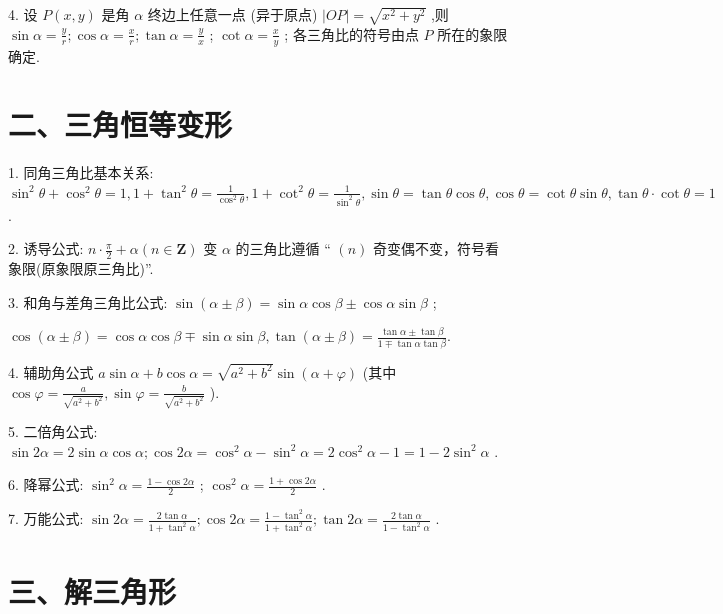 4. 设 $P\left( {x,y}\right)$ 是角 $\alpha$ 终边上任意一点 (异于原点) $\left| {OP}\right|  = \sqrt{{x}^{2} + {y}^{2}}$ ,则 $\sin \alpha  = \frac{y}{r};\cos \alpha  = \frac{x}{r};\tan \alpha  = \frac{y}{x}$ ; $\cot \alpha  = \frac{x}{y}$ ; 各三角比的符号由点 $P$ 所在的象限确定.

\section*{二、三角恒等变形}

1. 同角三角比基本关系: ${\sin }^{2}\theta  + {\cos }^{2}\theta  = 1,1 + {\tan }^{2}\theta  = \frac{1}{{\cos }^{2}\theta },1 + {\cot }^{2}\theta  = \frac{1}{{\sin }^{2}\theta },\sin \theta  = \tan \theta \cos \theta ,\cos \theta  =  \cot \theta \sin \theta ,\tan \theta  \cdot  \cot \theta  = 1$ .

2. 诱导公式: $n \cdot  \frac{\pi }{2} + \alpha \left( {n \in  \mathbf{Z}}\right)$ 变 $\alpha$ 的三角比遵循 “ $\left( n\right)$ 奇变偶不变，符号看象限(原象限原三角比)”.

3. 和角与差角三角比公式: $\sin \left( {\alpha  \pm  \beta }\right)  = \sin \alpha \cos \beta  \pm  \cos \alpha \sin \beta$ ;

$\cos \left( {\alpha  \pm  \beta }\right)  = \cos \alpha \cos \beta  \mp  \sin \alpha \sin \beta ,\tan \left( {\alpha  \pm  \beta }\right)  = \frac{\tan \alpha  \pm  \tan \beta }{1 \mp  \tan \alpha \tan \beta }.$

4. 辅助角公式 $a\sin \alpha  + b\cos \alpha  = \sqrt{{a}^{2} + {b}^{2}}\sin \left( {\alpha  + \varphi }\right)$ (其中 $\cos \varphi  = \frac{a}{\sqrt{{a}^{2} + {b}^{2}}},\sin \varphi  = \frac{b}{\sqrt{{a}^{2} + {b}^{2}}}$ ).

5. 二倍角公式: $\sin {2\alpha } = 2\sin \alpha \cos \alpha ;\cos {2\alpha } = {\cos }^{2}\alpha  - {\sin }^{2}\alpha  = 2{\cos }^{2}\alpha  - 1 = 1 - 2{\sin }^{2}\alpha$ .

6. 降幂公式: ${\sin }^{2}\alpha  = \frac{1 - \cos {2\alpha }}{2}$ ; ${\cos }^{2}\alpha  = \frac{1 + \cos {2\alpha }}{2}$ .

7. 万能公式: $\sin {2\alpha } = \frac{2\tan \alpha }{1 + {\tan }^{2}\alpha };\cos {2\alpha } = \frac{1 - {\tan }^{2}\alpha }{1 + {\tan }^{2}\alpha };\tan {2\alpha } = \frac{2\tan \alpha }{1 - {\tan }^{2}\alpha }$ .

\section*{三、解三角形}


